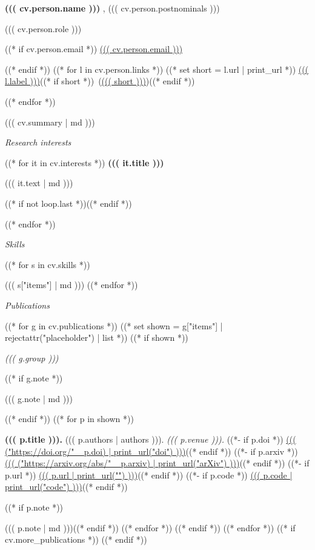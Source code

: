 \documentclass[10pt,letterpaper]{article}
\newlength{\gutter}\setlength{\gutter}{2.4cm}
\newcommand{\cvsection}[1]{%
  \par\addvspace{1.1em}%
  {\Large\itshape #1\par}\nopagebreak\vspace{0.4em}}
\newcommand{\pubgroup}[1]{%
  \par\addvspace{1em}%
  {\itshape\color{muted}#1\par}\nopagebreak\vspace{0.3em}}
\newenvironment{dated}{%
  \list{}{%
    \setlength{\leftmargin}{0pt}%
    \setlength{\labelwidth}{\gutter}%
    \setlength{\labelsep}{0pt}%
    \setlength{\itemindent}{0pt}%
    \setlength{\topsep}{0pt}%
    \setlength{\partopsep}{0pt}%
    \setlength{\parsep}{0pt}%
    \setlength{\itemsep}{0.55em}%
    \renewcommand{\makelabel}[1]{\hfill{\color{muted}##1}\hspace{1em}}}}%
  {\endlist}
\newenvironment{skilllist}{%
  \list{}{%
    \setlength{\leftmargin}{9.5em}%
    \setlength{\labelwidth}{8.5em}%
    \setlength{\labelsep}{1em}%
    \setlength{\topsep}{0pt}%
    \setlength{\partopsep}{0pt}%
    \setlength{\parsep}{0pt}%
    \setlength{\itemsep}{0.35em}%
    \renewcommand{\makelabel}[1]{\smash{\parbox[t]{\labelwidth}{\RaggedRight\hyphenpenalty=10000\bfseries ##1}}\hfill}}}%
  {\endlist}
\begin{document}
{\fontsize{24}{28}\selectfont\bfseries ((( cv.person.name )))}%
{\Large\color{muted}, ((( cv.person.postnominals )))}\par
\vspace{0.3em}
{\color{muted}((( cv.person.role )))}\par
\vspace{0.4em}
{\small
((* if cv.person.email *))
\href{mailto:((( cv.person.email )))}{((( cv.person.email )))}\par
((* endif *))
((* for l in cv.person.links *))
((* set short = l.url | print_url *))
\href{((( l.url | url )))}{((( l.label )))}((* if short *))~{\color{muted}(\href{((( l.url | url )))}{((( short )))})}((* endif *))\par
((* endfor *))
}

\vspace{1.2em}
{\fontsize{11}{14.5}\selectfont ((( cv.summary | md )))\par}

\cvsection{Research interests}
((* for it in cv.interests *))
\textbf{((( it.title )))}\par
((( it.text | md )))\par
((* if not loop.last *))\vspace{0.6em}((* endif *))

((* endfor *))

\cvsection{Skills}
\begin{skilllist}
((* for s in cv.skills *))
\item[((( s.area )))] ((( s["items"] | md )))
((* endfor *))
\end{skilllist}

\cvsection{Publications}
((* for g in cv.publications *))
((* set shown = g["items"] | rejectattr("placeholder") | list *))
((* if shown *))
\pubgroup{((( g.group )))}
((* if g.note *)){\small\color{muted}((( g.note | md )))\par}\nopagebreak\vspace{0.3em}((* endif *))
\begin{dated}
((* for p in shown *))
\item[((( p.year )))] \textbf{((( p.title ))).} ((( p.authors | authors ))). \emph{((( p.venue ))).}
((*- if p.doi *)) \href{https://doi.org/((( p.doi | url )))}{((( ("https://doi.org/" ~ p.doi) | print_url("doi") )))}((* endif *))
((*- if p.arxiv *)) \href{https://arxiv.org/abs/((( p.arxiv | url )))}{((( ("https://arxiv.org/abs/" ~ p.arxiv) | print_url("arXiv") )))}((* endif *))
((*- if p.url *)) \href{((( p.url | url )))}{((( p.url | print_url("") )))}((* endif *))
((*- if p.code *)) \href{((( p.code | url )))}{((( p.code | print_url("code") )))}((* endif *))

((* if p.note *))\par{\small\color{muted}((( p.note | md )))}((* endif *))
((* endfor *))
\end{dated}
((* endif *))
((* endfor *))
((* if cv.more_publications *))
((* endif *))
\end{document}
